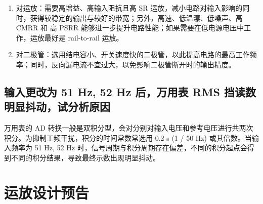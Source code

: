\documentclass[UTF8]{article}
\begin{document}
\begin{enumerate}
\item 对运放：需要高增益、高输入阻抗且高 SR 运放，减小电路对输入影响的同时，获得较稳定的输出与较好的带宽；另外，高速、低温漂、低噪声、高 CMRR 和 高 PSRR 能够进一步提升电路性能；如果需要在低电源电压中工作，运放最好是 rail-to-rail 运放。

\item 对二极管：选用结电容小、开关速度快的二极管，以此提高电路的最高工作频率；同时，反向漏电流不宜过大，以免影响二极管断开时的输出精度。
\end{enumerate}



\subsection{输入更改为 51 Hz, 52 Hz 后，万用表 RMS 挡读数明显抖动，试分析原因}

万用表的 AD 转换一般是双积分型，会对分别对输入电压和参考电压进行共两次积分。为抑制工频干扰，积分的时间常数常选用 0.2 s (1 / 50 Hz) 或其倍数。当输入频率为 51 Hz, 52 Hz 时，信号周期与积分周期存在偏差，不同的积分起点会得到不同的积分结果，导致最终示数出现明显抖动。



\section{运放设计预告}
\end{document}
